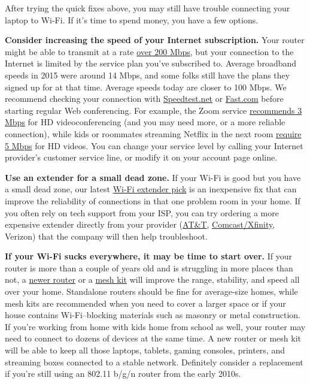 After trying the quick fixes above, you may still have trouble
connecting your laptop to Wi-Fi. If it's time to spend money, you have a
few options.

\textbf{Consider increasing the speed of your Internet subscription.}
Your router might be able to transmit at a rate
\href{https://www.nytimes.com/wirecutter/reviews/best-wi-fi-router/\#an-overview-of-the-test-results}{over
200 Mbps}, but your connection to the Internet is limited by the service
plan you've subscribed to. Average broadband speeds in 2015 were around
14 Mbps, and some folks still have the plans they signed up for at that
time. Average speeds today are closer to 100 Mbps. We recommend checking
your connection with \href{https://www.speedtest.net/}{Speedtest.net} or
\href{https://fast.com/}{Fast.com} before starting regular Web
conferencing. For example, the Zoom service
\href{https://support.zoom.us/hc/en-us/articles/201362023-System-Requirements-for-PC-Mac-and-Linux}{recommends
3 Mbps} for HD videoconferencing (and you may need more, or a more
reliable connection), while kids or roommates streaming Netflix in the
next room \href{https://help.netflix.com/en/node/306}{require 5 Mbps}
for HD videos. You can change your service level by calling your
Internet provider's customer service line, or modify it on your account
page online.

\textbf{Use an extender for a small dead zone.} If your Wi-Fi is good
but you have a small dead zone, our latest
\href{https://www.nytimes.com/wirecutter/reviews/best-wi-fi-extender/}{Wi-Fi
extender pick} is an inexpensive fix that can improve the reliability of
connections in that one problem room in your home. If you often rely on
tech support from your ISP, you can try ordering a more expensive
extender directly from your provider
(\href{https://www.nytimes.com/wirecutter/out/link/37503/160244/4/111781/?merchant=AT\%26T}{AT\&T},
\href{https://www.nytimes.com/wirecutter/out/link/37504/160245/4/111782/?merchant=Xfinity}{Comcast/Xfinity},
Verizon) that the company will then help troubleshoot.

\textbf{If your Wi-Fi sucks everywhere, it may be time to start over.}
If your router is more than a couple of years old and is struggling in
more places than not, a
\href{https://www.nytimes.com/wirecutter/reviews/best-wi-fi-router/}{newer
router} or a
\href{https://www.nytimes.com/wirecutter/reviews/best-wi-fi-mesh-networking-kits/}{mesh
kit} will improve the range, stability, and speed all over your home.
Standalone routers should be fine for average-size homes, while mesh
kits are recommended when you need to cover a larger space or if your
house contains Wi-Fi--blocking materials such as masonry or metal
construction. If you're working from home with kids home from school as
well, your router may need to connect to dozens of devices at the same
time. A new router or mesh kit will be able to keep all those laptops,
tablets, gaming consoles, printers, and streaming boxes connected to a
stable network. Definitely consider a replacement if you're still using
an 802.11 b/g/n router from the early 2010s.

